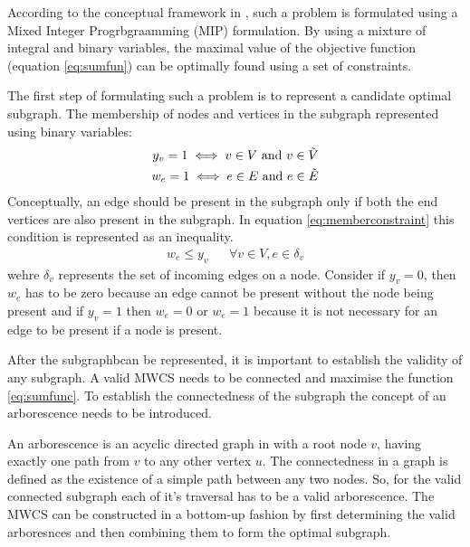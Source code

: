 \documentclass[msthesis.tex]{subfiles}
\begin{document}
According to the conceptual framework in \cite{DBLP:journals/corr/LobodaAS16}, such a problem is formulated using a Mixed Integer Progrbgraamming (MIP) formulation. By using  a mixture of integral and binary variables, the maximal value of the objective function (equation \ref{eq:sumfun}) can be optimally found using a set of constraints.

The first step of formulating such a problem is to represent a candidate optimal subgraph. The membership of nodes and vertices in the subgraph represented using binary variables:
\begin{align}
    \label{eq:y_v}
    y_v = 1  \iff v \in V  \textrm{ and } v \in \Tilde{V} \\
    \label{eq:w_e}
    w_e =1  \iff e \in E  \textrm{  and }  e \in \Tilde{E}
\end{align}
Conceptually, an edge should be present in the subgraph only if both the end vertices are also present in the subgraph. In equation \ref{eq:memberconstraint} this condition is represented as an inequality.
\begin{align}
    \label{eq:memberconstraint}
    w_e \leq y_v && \forall v \in V, e \in \delta_{v}
\end{align}
wehre $\delta_{v}$ represents the set of incoming edges on a node. Consider if $y_v = 0$, then $w_e$ has to be zero because an edge cannot be present without the node being present and if $y_v = 1$ then $w_e = 0$ or $w_e = 1$ because it is not necessary for an edge to be present if a node is present.

After the subgraphbcan be represented, it is important to establish the validity of any subgraph. A valid MWCS needs to be connected and maximise the function \ref{eq:sumfunc}. To establish the connectedness of the subgraph the concept of an arborescence needs to be introduced.

An arborescence is an acyclic directed graph in with a root node $v$, having exactly one path from $v$ to any other vertex $u$. The connectedness in a graph is defined as the existence of a simple path between any two nodes. So, for the valid connected subgraph each of it's traversal has to be a valid arborescence. The MWCS can be constructed in a bottom-up fashion by first determining the valid arboresnces and then combining them to form the optimal subgraph.
\end{document}
